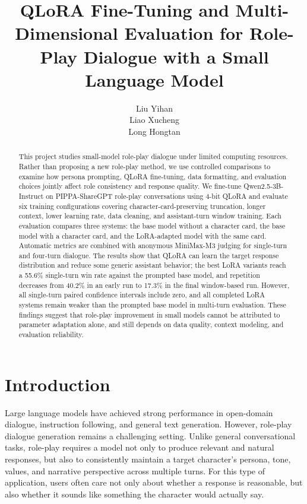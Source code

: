 \documentclass{article}
\title{QLoRA Fine-Tuning and Multi-Dimensional Evaluation for Role-Play Dialogue with a Small Language Model}
\author{%
  Liu Yihan \\
  \And
  Liao Xucheng \\
  \And
  Long Hongtan
}
\begin{document}
\maketitle

\begin{abstract}
This project studies small-model role-play dialogue under limited computing
resources. Rather than proposing a new role-play method, we use controlled
comparisons to examine how persona prompting, QLoRA fine-tuning, data
formatting, and evaluation choices jointly affect role consistency and response
quality. We fine-tune Qwen2.5-3B-Instruct on PIPPA-ShareGPT role-play
conversations using 4-bit QLoRA and evaluate six training configurations
covering character-card-preserving truncation, longer context, lower learning
rate, data cleaning, and assistant-turn window training. Each evaluation
compares three systems: the base model without a character card, the base model
with a character card, and the LoRA-adapted model with the same card. Automatic
metrics are combined with anonymous MiniMax-M3 judging for single-turn and
four-turn dialogue. The results show that QLoRA can learn the target response
distribution and reduce some generic assistant behavior; the best LoRA variants
reach a 55.6\% single-turn win rate against the prompted base model, and
repetition decreases from 40.2\% in an early run to 17.3\% in the final
window-based run. However, all single-turn paired confidence intervals include
zero, and all completed LoRA systems remain weaker than the prompted base model
in multi-turn evaluation. These findings suggest that role-play improvement in
small models cannot be attributed to parameter adaptation alone, and still
depends on data quality, context modeling, and evaluation reliability.
\end{abstract}

\section{Introduction}

Large language models have achieved strong performance in open-domain dialogue,
instruction following, and general text generation. However, role-play dialogue
generation remains a challenging setting. Unlike general conversational tasks,
role-play requires a model not only to produce relevant and natural responses,
but also to consistently maintain a target character's persona, tone, values,
and narrative perspective across multiple turns. For this type of application,
users often care not only about whether a response is reasonable, but also
whether it sounds like something the character would actually say.
\end{document}
